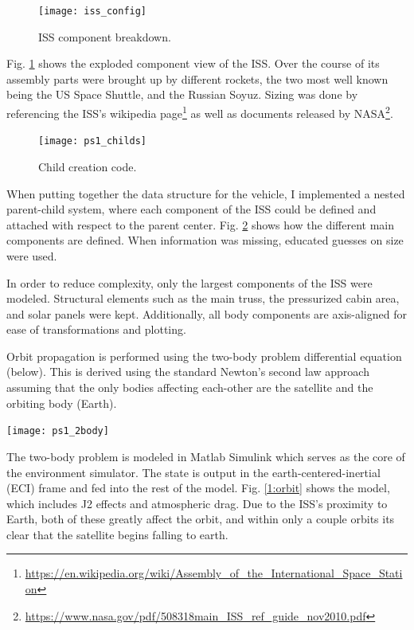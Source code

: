 \documentclass[12pt, letterpaper]{article}
\begin{document}
\begin{figure}[H]
	\centering
	\texttt{[image: iss\_config]}
	\caption{ISS component breakdown.}
	\label{1:config}
\end{figure}

Fig. \ref{1:config} shows the exploded component view of the ISS. Over the course of its assembly parts were brought up by different rockets, the two most well known being the US Space Shuttle, and the Russian Soyuz. Sizing was done by referencing the ISS's wikipedia page\footnote{\url{https://en.wikipedia.org/wiki/Assembly_of_the_International_Space_Station}} as well as documents released by NASA\footnote{\url{https://www.nasa.gov/pdf/508318main_ISS_ref_guide_nov2010.pdf}}.


\begin{figure}[H]
	\centering
	\texttt{[image: ps1\_childs]}
	\caption{Child creation code.}
	\label{1:code1}
\end{figure}

When putting together the data structure for the vehicle, I implemented a nested parent-child system, where each component of the ISS could be defined and attached with respect to the parent center. Fig. \ref{1:code1} shows how the different main components are defined. When information was missing, educated guesses on size were used.

In order to reduce complexity, only the largest components of the ISS were modeled. Structural elements such as the main truss, the pressurized cabin area, and solar panels were kept. Additionally, all body components are axis-aligned for ease of transformations and plotting.

Orbit propagation is performed using the two-body problem differential equation (below). This is derived using the standard Newton's second law approach assuming that the only bodies affecting each-other are the satellite and the orbiting body (Earth).

\begin{center}\texttt{[image: ps1\_2body]}\end{center}


The two-body problem is modeled in Matlab Simulink which serves as the core of the environment simulator. The state is output in the earth-centered-inertial (ECI) frame and fed into the rest of the model. Fig. \ref{1:orbit} shows the model, which includes J2 effects and atmospheric drag. Due to the ISS's proximity to Earth, both of these greatly affect the orbit, and within only a couple orbits its clear that the satellite begins falling to earth.
\end{document}
